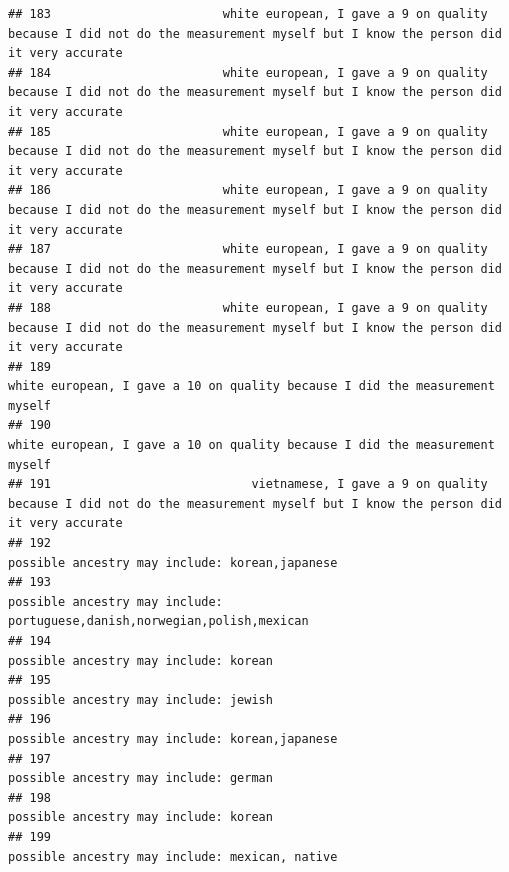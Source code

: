 \documentclass[]{article}
\begin{document}
\begin{verbatim}
## 183                        white european, I gave a 9 on quality because I did not do the measurement myself but I know the person did it very accurate
## 184                        white european, I gave a 9 on quality because I did not do the measurement myself but I know the person did it very accurate
## 185                        white european, I gave a 9 on quality because I did not do the measurement myself but I know the person did it very accurate
## 186                        white european, I gave a 9 on quality because I did not do the measurement myself but I know the person did it very accurate
## 187                        white european, I gave a 9 on quality because I did not do the measurement myself but I know the person did it very accurate
## 188                        white european, I gave a 9 on quality because I did not do the measurement myself but I know the person did it very accurate
## 189                                                                         white european, I gave a 10 on quality because I did the measurement myself
## 190                                                                         white european, I gave a 10 on quality because I did the measurement myself
## 191                            vietnamese, I gave a 9 on quality because I did not do the measurement myself but I know the person did it very accurate
## 192                                                                                                      possible ancestry may include: korean,japanese
## 193                                                                           possible ancestry may include: portuguese,danish,norwegian,polish,mexican
## 194                                                                                                               possible ancestry may include: korean
## 195                                                                                                               possible ancestry may include: jewish
## 196                                                                                                      possible ancestry may include: korean,japanese
## 197                                                                                                               possible ancestry may include: german
## 198                                                                                                               possible ancestry may include: korean
## 199                                                                                                      possible ancestry may include: mexican, native

\end{verbatim}
\end{document}
